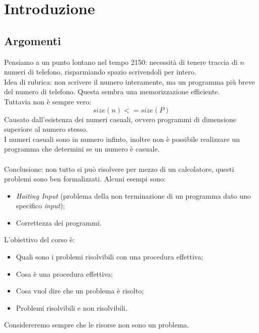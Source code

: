 \documentclass[10pt,a4paper]{book}
\begin{document}
\chapter{Introduzione}
\section{Argomenti}
Pensiamo a un punto lontano nel tempo 2150: necessit\`a di tenere traccia di $n$ numeri di telefono, risparmiando spazio scrivendoli per intero.\\
Idea di rubrica: non scrivere il numero interamente, ma un programma pi\`u breve del numero di telefono. Questa sembra una memorizzazione efficiente.\\
Tuttavia non \`e sempre vero:
\begin{equation}size(n) <= size(P)\end{equation}
Causato dall'esistenza dei numeri casuali, ovvero programmi di dimensione superiore al numero stesso.\\
I numeri casuali sono in numero infinto, inoltre non \`e possibile realizzare un programma che determini se un numero \`e casuale.\\\\
Conclusione: non tutto si pu\`o risolvere per mezzo di un calcolatore, questi problemi sono ben formalizzati. Alcuni esempi sono:
\begin{itemize}
\item \textit{Haiting Input} (problema della non terminazione di un programma dato uno specifico \textit{input});
\item Correttezza dei programmi.
\end{itemize}
L'obiettivo del corso \`e:
\begin{itemize}
\item Quali sono i problemi risolvibili con una procedura effettiva;
\item Cosa \`e una procedura effettiva;
\item Cosa vuol dire che un problema \`e risolto;
\item Problemi risolvibili e non risolvibili.
\end{itemize}
\noindent
Considereremo sempre che le risorse non sono un problema.
\end{document}

